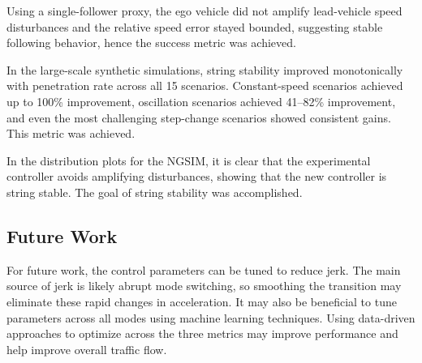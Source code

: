 \documentclass[conference]{IEEEtran}
\begin{document}
Using a single-follower proxy, the ego vehicle did not amplify lead-vehicle speed disturbances and the relative speed error stayed bounded, suggesting stable following behavior, hence the success metric was achieved.

In the large-scale synthetic simulations, string stability improved monotonically with penetration rate across all 15 scenarios. Constant-speed scenarios achieved up to 100\% improvement, oscillation scenarios achieved 41--82\% improvement, and even the most challenging step-change scenarios showed consistent gains. This metric was achieved.

In the distribution plots for the NGSIM, it is clear that the experimental controller avoids amplifying disturbances, showing that the new controller is string stable. The goal of string stability was accomplished.

\subsection{Future Work}

 For future work, the control parameters can be tuned to reduce jerk. The main source of jerk is likely abrupt mode switching, so smoothing the transition may eliminate these rapid changes in acceleration.
 It may also be beneficial to tune parameters across all modes using machine learning techniques. Using data-driven approaches to optimize across the three metrics may improve performance and help improve overall traffic flow.



\end{document}
